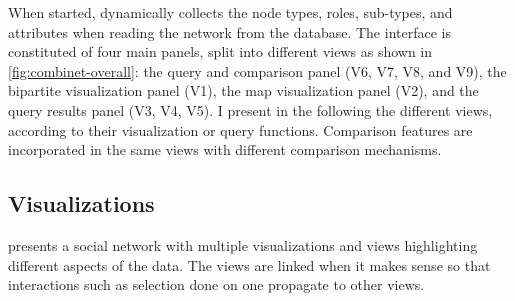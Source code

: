 \begin{table}[]
\centering
{}
    \caption{Comparison of the data model of several VA systems aimed at exploring bipartite social networks.
    }\label{tab:combinet-VA-comparison}
\end{table}


When started, \name dynamically collects the node types, roles, sub-types, and attributes when reading the network from the database. The interface is constituted of four main panels, split into different views as shown in \autoref{fig:combinet-overall}: the query and comparison panel (V6, V7, V8, and V9), the bipartite visualization panel (V1), the map visualization panel (V2), and the query results panel (V3, V4, V5).
I present in the following the different views, according to their visualization or query functions.
Comparison features are incorporated in the same views with different comparison mechanisms.


\subsection{Visualizations}

\name presents a social network with multiple visualizations and views highlighting different aspects of the data.
The views are linked when it makes sense so that interactions such as selection done on one propagate to other views.

